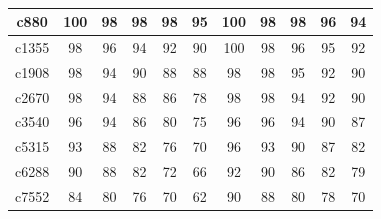 \begin{latin}
\begin{table}[]
\begin{tabular}{|c|c|c|c|c|c|c|c|c|c|c|}
		c880                  & 100                  & 98                   & 98                   & 98                   & 95                 & 100                  & 98                   & 98                   & 96                   & 94                   \\ \hline
		c1355                 & 98                   & 96                   & 94                   & 92                   & 90                 & 100                  & 98                   & 96                   & 95                   & 92                   \\ \hline
		c1908                 & 98                   & 94                   & 90                   & 88                   & 88                 & 98                   & 98                   & 95                   & 92                   & 90                   \\ \hline
		c2670                 & 98                   & 94                   & 88                   & 86                   & 78                 & 98                   & 98                   & 94                   & 92                   & 90                   \\ \hline
		c3540                 & 96                   & 94                   & 86                   & 80                   & 75                 & 96                   & 96                   & 94                   & 90                   & 87                   \\ \hline
		c5315                 & 93                   & 88                   & 82                   & 76                   & 70                 & 96                   & 93                   & 90                   & 87                   & 82                   \\ \hline
		c6288                 & 90                   & 88                   & 82                   & 72                   & 66                 & 92                   & 90                   & 86                   & 82                   & 79                   \\ \hline
		c7552                 & 84                   & 80                   & 76                   & 70                   & 62                 & 90                   & 88                   & 80                   & 78                   & 70                   \\ \hline
	\end{tabular}
	\caption{}
\end{table}
\end{latin}

